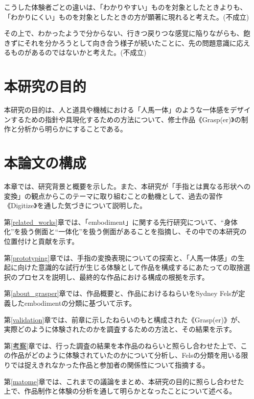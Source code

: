 こうした体験者ごとの違いは、「わかりやすい」ものを対象としたときよりも、「わかりにくい」ものを対象としたときの方が顕著に現れると考えた。(不成立)

その上で、わかったようで分からない、行きつ戻りつな感覚に陥りながらも、飽きずにそれを分かろうとして向き合う様子が続いたことに、先の問題意識に応えるものがあるのではないかと考えた。(不成立)

\section{本研究の目的}

本研究の目的は、人と道具や機械における「人馬一体」のような一体感をデザインするための指針や具現化するための方法について、修士作品《Grasp(er)》の制作と分析から明らかにすることである。

\section{本論文の構成}
本章では、研究背景と概要を示した。また、本研究が「手指とは異なる形状への変換」の観点からこのテーマに取り組むことの動機として、過去の習作《Digitize》を通した気づきについて説明した。

第\ref{related_works}章では、「embodiment」に関する先行研究について、``身体化''を扱う側面と``一体化''を扱う側面があることを指摘し、その中での本研究の位置付けと貢献を示す。

第\ref{prototyping}章では、手指の変換表現についての探索と、「人馬一体感」の生起に向けた意識的な試行が生じる体験として作品を構成するにあたっての取捨選択のプロセスを説明し、最終的な作品における構成の根拠を示す。

第\ref{about_grasper}章では、作品概要と、作品におけるねらいをSydney Felsが定義したembodimentの分類に基づいて示す。

第\ref{validation}章では、前章に示したねらいのもと構成された《Grasp(er)》が、実際どのように体験されたのかを調査するための方法と、その結果を示す。

第\ref{考察}章では、行った調査の結果を本作品のねらいと照らし合わせた上で、この作品がどのように体験されていたのかについて分析し、Felsの分類を用いる限りでは捉えきれなかった作品と参加者の関係性について指摘する。

第\ref{matome}章では、これまでの議論をまとめ、本研究の目的に照らし合わせた上で、作品制作と体験の分析を通して明らかとなったことについて述べる。